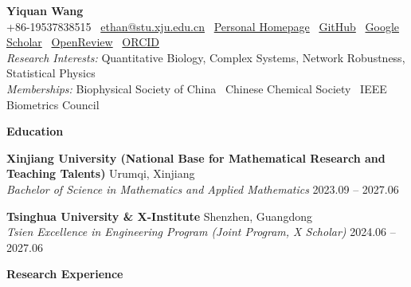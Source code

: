 \documentclass[10pt]{article}
\begin{document}
	\pagestyle{empty}
	\begin{center}
		\textbf{\Large Yiquan Wang}\\
		\vspace{3pt}
		+86-19537838515 \textbullet \ \href{mailto:ethan@stu.xju.edu.cn}{ethan@stu.xju.edu.cn} \textbullet \ \href{https://wyqmath.cn/}{Personal Homepage} \textbullet \ \href{https://github.com/wyqmath}{GitHub} \textbullet \ \href{https://scholar.google.com/citations?user=ULP3e1cAAAAJ}{Google Scholar} \textbullet \ \href{https://openreview.net/profile?id=~Yiquan_Wang3}{OpenReview} \textbullet \ \href{https://orcid.org/0000-0003-1417-5752}{ORCID} \\
		\vspace{2pt}
		\textit{Research Interests:} Quantitative Biology, Complex Systems, Network Robustness, Statistical Physics \\
		\vspace{2pt}
		\textit{Memberships:} Biophysical Society of China \textbullet \ Chinese Chemical Society \textbullet \ IEEE Biometrics Council \\
		\vspace{-2pt}
		\hrulefill
	\end{center}
	
	\vspace{-2pt}
	\begin{center}
		\textbf{\large Education}
	\end{center}
	\vspace{-4pt}
	\textbf{Xinjiang University (National Base for Mathematical Research and Teaching Talents)} \hfill Urumqi, Xinjiang \\
	\textit{Bachelor of Science in Mathematics and Applied Mathematics} \hfill 2023.09 – 2027.06 
	
	\vspace{2pt}
	\textbf{Tsinghua University \& X-Institute} \hfill Shenzhen, Guangdong \\
	\textit{Tsien Excellence in Engineering Program (Joint Program, X Scholar)} \hfill 2024.06 – 2027.06
	
	\vspace{2pt}
	\begin{center}
		\textbf{\large Research Experience}
	\end{center}
	\vspace{-4pt}
	
\end{document}
